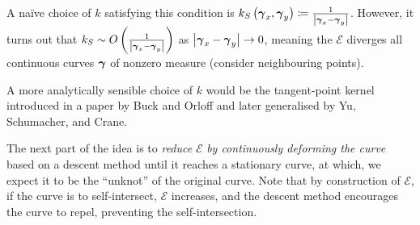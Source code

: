 \documentclass[../dissertation.tex]{subfiles}
\begin{document}
A na\"ive choice of $k$ satisfying this condition is $k_S \left( \boldsymbol{\gamma}_x, \boldsymbol{\gamma}_y \right) \coloneqq \frac{1}{\left| \boldsymbol{\gamma}_x - \boldsymbol{\gamma}_y \right|}$.
However, it turns out that $k_S \sim O\left( \frac{1}{\left| \boldsymbol{\gamma}_x - \boldsymbol{\gamma}_y \right|} \right)$ as $\left| \boldsymbol{\gamma}_x - \boldsymbol{\gamma}_y \right| \rightarrow 0$, meaning the $\mathcal{E}$ diverges all continuous curves $\boldsymbol{\gamma}$ of nonzero measure (consider neighbouring points).

A more analytically sensible choice of $k$ would be the tangent-point kernel introduced in a paper by Buck and Orloff\cite{BO1995} and later generalised by Yu, Schumacher, and Crane\cite{YSC2021}.

The next part of the idea is to \emph{reduce} $\mathcal{E}$ \emph{by continuously deforming the curve} based on a descent method until it reaches a stationary curve, at which, we expect it to be the ``unknot'' of the original curve.
Note that by construction of $\mathcal{E}$, if the curve is to self-intersect, $\mathcal{E}$ increases, and the descent method encourages the curve to repel, preventing the self-intersection.
\end{document}
